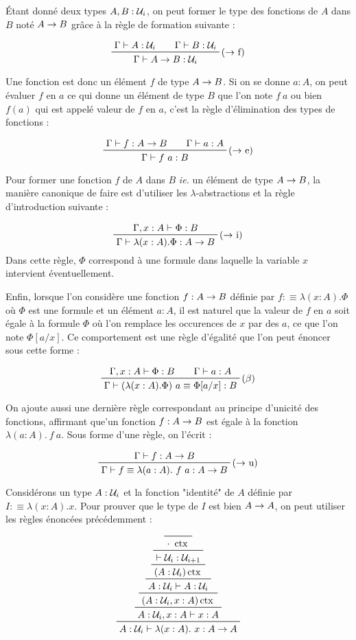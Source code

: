 \documentclass[../../rapport.tex]{subfiles}
\begin{document}
  Étant donné deux types $A, B : \mathcal U_i$, on peut former le type des fonctions de $A$ dans $B$ noté $A \rightarrow B$
  grâce à la règle de formation suivante :

  $$
  \prfinterspace=2em
  \prftree[r]{($\fun$ f)}{\Gamma \vdash A : \U_i}{\Gamma \vdash B : \U_i}{\Gamma \vdash A \fun B : \U_i}
  $$

  Une fonction est donc un élément $f$ de type $A \rightarrow B$.
  Si on se donne $a : A$, on peut évaluer $f$ en $a$ ce qui donne un élément de type $B$
  que l'on note $f\ a$ ou bien $f(a)$ qui est appelé valeur de $f$ en $a$, c'est la règle d'élimination des types de fonctions :

  $$
  \prfinterspace=2em
  \prftree[r]{($\fun$ e)}{\Gamma \vdash f : A \fun B}{\Gamma \vdash a : A}{\Gamma \vdash f\ a : B}
  $$

  Pour former une fonction $f$ de $A$ dans $B$ \textit{ie.} un élément de type $A \rightarrow B$,
  la manière canonique de faire est d'utiliser les $\lambda$-abstractions et la règle d'introduction suivante :

  $$
  \prftree[r]{($\fun$ i)}{\Gamma, x : A \vdash \Phi : B}{\Gamma \vdash \lambda (x : A). \Phi : A \fun B}
  $$
  Dans cette règle, $\Phi$ correspond à une formule dans laquelle la variable $x$ intervient éventuellement.

  Enfin, lorsque l'on considère une fonction $f : A \rightarrow B$ définie par $f :\equiv \lambda (x : A). \Phi$
  où $\Phi$ est une formule et un élément $a : A$, il est naturel que la valeur de $f$ en $a$ soit égale à
  la formule $\Phi$ où l'on remplace les occurences de $x$ par des $a$, ce que l'on note $\Phi[a/x]$.
  Ce comportement est une règle d'égalité que l'on peut énoncer sous cette forme :

  $$
  \prfinterspace=2em
  \prftree[r]{($\beta$)}{\Gamma, x : A \vdash \Phi : B}{\Gamma \vdash a : A}
    {\Gamma \vdash (\lambda(x : A).\Phi)\ a \equiv \Phi[a/x] : B}
  $$

  On ajoute aussi une dernière règle correspondant au principe d'unicité des fonctions,
  affirmant que'un fonction $f : A \rightarrow B$ est égale à la fonction $\lambda (a: A).\ f\ a$.
  Sous forme d'une règle, on l'écrit :

  $$
  \prfinterspace=2em
  \prftree[r]{($\fun$ u)}
    {\Gamma \vdash f : A \fun B}
  {\Gamma \vdash f \equiv \lambda(a: A).\ f\ a : A \fun B}
  $$

  \begin{example}
    Considérons un type $A : \mathcal U_i$ et la fonction "identité" de $A$ définie par $I :\equiv \lambda(x : A).x$.
    Pour prouver que le type de $I$ est bien $A \rightarrow A$, on peut utiliser les règles énoncées précédemment :

    $$
    \prftree
      {\prftree
	{\prftree
	  {\prftree
	    {\prftree
	      {\prftree
		{\prfaxiom{\cdot\ \ctx}}
	      {\vdash \U_i : \U_{i+1}}}
	    {(A : \U_i) \ctx}}
	  {A : \U_i \vdash A : \U_i}}
	{(A : \U_i, x : A) \ctx}}
      {A : \U_i, x : A \vdash x : A}}
    {A : \U_i \vdash \lambda(x:A).\ x : A \fun A}
    $$
  \end{example}
\end{document}

